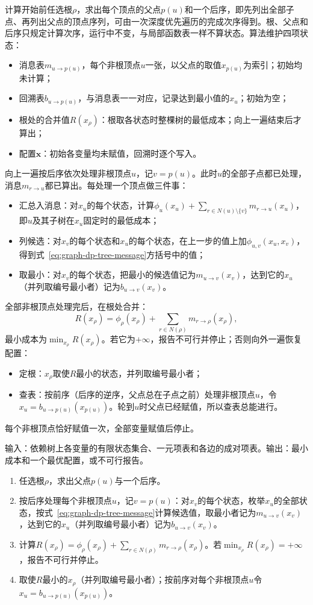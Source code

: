 计算开始前任选根$\rho$，求出每个顶点的父点$p(u)$和一个后序，即先列出全部子点、再列出父点的顶点序列，可由一次深度优先遍历的完成次序得到。根、父点和后序只规定计算次序，运行中不变，与局部函数表一样不算状态。算法维护四项状态：
\begin{itemize}
  \item 消息表$m_{u\to p(u)}$，每个非根顶点$u$一张，以父点的取值$x_{p(u)}$为索引；初始均未计算；
  \item 回溯表$b_{u\to p(u)}$，与消息表一一对应，记录达到最小值的$x_u$；初始为空；
  \item 根处的合并值$R(x_\rho)$：根取各状态时整棵树的最低成本；向上一遍结束后才算出；
  \item 配置$\bm x$：初始各变量均未赋值，回溯时逐个写入。
\end{itemize}
向上一遍按后序依次处理非根顶点$u$，记$v=p(u)$。此时$u$的全部子点都已处理，消息$m_{r\to u}$都已算出。每处理一个顶点做三件事：
\begin{itemize}
  \item 汇总入消息：对$x_u$的每个状态，计算$\phi_u(x_u)+\sum_{r\in N(u)\setminus\{v\}}m_{r\to u}(x_u)$，即$u$及其子树在$x_u$固定时的最低成本；
  \item 列候选：对$x_v$的每个状态和$x_u$的每个状态，在上一步的值上加$\phi_{u,v}(x_u,x_v)$，得到式~\eqref{eq:graph-dp-tree-message}方括号中的值；
  \item 取最小：对$x_v$的每个状态，把最小的候选值记为$m_{u\to v}(x_v)$，达到它的$x_u$（并列取编号最小者）记为$b_{u\to v}(x_v)$。
\end{itemize}
全部非根顶点处理完后，在根处合并：
\[
R(x_\rho)=\phi_\rho(x_\rho)+\sum_{r\in N(\rho)}m_{r\to\rho}(x_\rho),
\]
最小成本为$\min_{x_\rho}R(x_\rho)$。若它为$+\infty$，报告不可行并停止；否则向外一遍恢复配置：
\begin{itemize}
  \item 定根：$x_\rho$取使$R$最小的状态，并列取编号最小者；
  \item 查表：按前序（后序的逆序，父点总在子点之前）处理非根顶点$u$，令$x_u=b_{u\to p(u)}(x_{p(u)})$。轮到$u$时父点已经赋值，所以查表总能进行。
\end{itemize}
每个非根顶点恰好赋值一次，全部变量赋值后停止。

\begin{algorithm}[树上的消息递推]
\label{alg:graph-dp-tree-messages}
输入：依赖树上各变量的有限状态集合、一元项表和各边的成对项表。输出：最小成本和一个最优配置，或不可行报告。
\begin{enumerate}
  \item 任选根$\rho$，求出父点$p(u)$与一个后序。
  \item 按后序处理每个非根顶点$u$，记$v=p(u)$：对$x_v$的每个状态，枚举$x_u$的全部状态，按式~\eqref{eq:graph-dp-tree-message}计算候选值，取最小者记为$m_{u\to v}(x_v)$，达到它的$x_u$（并列取编号最小者）记为$b_{u\to v}(x_v)$。
  \item 计算$R(x_\rho)=\phi_\rho(x_\rho)+\sum_{r\in N(\rho)}m_{r\to\rho}(x_\rho)$。若$\min_{x_\rho}R(x_\rho)=+\infty$，报告不可行并停止。
  \item 取使$R$最小的$x_\rho$（并列取编号最小者）；按前序对每个非根顶点$u$令$x_u=b_{u\to p(u)}(x_{p(u)})$。
\end{enumerate}
\end{algorithm}

